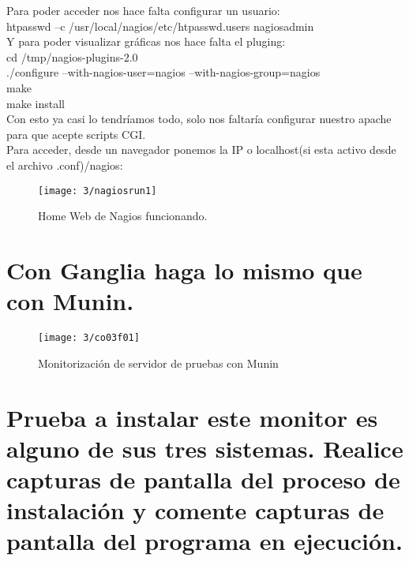 Para poder acceder nos hace falta configurar un usuario:\\

htpasswd –c /usr/local/nagios/etc/htpasswd.users nagiosadmin \\


Y para poder visualizar gráficas nos hace falta el pluging:\\

cd /tmp/nagios-plugins-2.0 \\
./configure --with-nagios-user=nagios --with-nagios-group=nagios \\
make \\
make install \\

Con esto ya casi lo tendríamos todo, solo nos faltaría configurar nuestro apache para que acepte scripts CGI.\\

Para acceder, desde un navegador ponemos la IP o localhost(si esta activo desde el archivo .conf)/nagios:

\begin{figure}[H]
	\centering
	\texttt{[image: 3/nagiosrun1]}
	\caption{Home Web de Nagios funcionando.}
	\label{fig:f18}
\end{figure}


\section{Con Ganglia haga lo mismo que con Munin.}

\begin{figure}[H]
	\centering
	\texttt{[image: 3/co03f01]}
	\caption{Monitorización de servidor de pruebas con Munin}
	\label{fig:f19}
\end{figure}



\section{Prueba a instalar este monitor es alguno de sus tres sistemas. Realice capturas de pantalla del proceso de instalación y comente capturas de pantalla del programa en ejecución.\cite{c09}}

